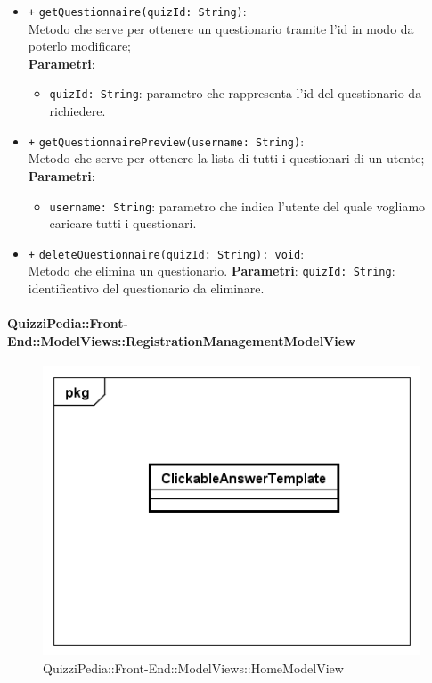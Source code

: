 \begin{itemize}
\begin{itemize}
			\item \texttt{+} \texttt{getQuestionnaire(quizId: String)}: \\Metodo che serve per ottenere un questionario tramite l'id in modo da poterlo modificare; \\
			\textbf{Parametri}:
			\begin{itemize}
				\item \texttt{quizId: String}: parametro che rappresenta l'id del questionario da richiedere.
			\end{itemize}
			\item \texttt{+} \texttt{getQuestionnairePreview(username: String)}: \\ Metodo che serve per ottenere la lista di tutti i questionari di un utente; \\
			\textbf{Parametri}:
			\begin{itemize}
				\item \texttt{username: String}: parametro che indica l'utente del quale vogliamo caricare tutti i questionari.
			\end{itemize}
			\item \texttt{+} \texttt{deleteQuestionnaire(quizId: String): void}: \\Metodo che elimina un questionario.
			\textbf{Parametri}:
			\texttt{quizId: String}: identificativo del questionario da eliminare.
		\end{itemize}
	\end{itemize}
	
	\paragraph{QuizziPedia::Front-End::ModelViews::RegistrationManagementModelView}
	
	\label{QuizziPedia::Front-End::ModelViews::RegistrationManagementModelView}
	
	\begin{figure}[ht]
		\centering
		\includegraphics[scale=0.5,keepaspectratio]{UML/Classi/Front-End/QuizziPedia_Front-end_Templates_ClickableAnswerTemplate.png}
		\caption{QuizziPedia::Front-End::ModelViews::HomeModelView}
	\end{figure} \FloatBarrier
	
